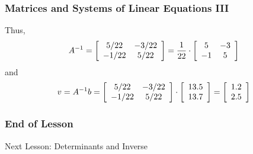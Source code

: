 \documentclass[xcolor=dvipsnames]{beamer}
\begin{document}
\begin{frame}
  \frametitle{Matrices and Systems of Linear Equations III}
Thus,
\begin{equation}
  \label{eq:oogeujie}
  A^{-1}=\left[\begin{array}{cc}
 5/22  & -3/22 \\
 -1/22 & 5/22
               \end{array}\right]=\frac{1}{22}\cdot\left[
               \begin{array}{cc}
                 5 & -3 \\
                 -1 & 5
               \end{array}\right]\notag
\end{equation}
and
\begin{equation}
  \label{eq:seeleeje}
  v=A^{-1}b=\left[\begin{array}{cc}
 5/22  & -3/22 \\
 -1/22 & 5/22
  \end{array}\right]\cdot
\left[\begin{array}{c}
 13.5   \\
 13.7  
  \end{array}\right]=\left[\begin{array}{c}
 1.2   \\
 2.5  
  \end{array}\right]\notag
\end{equation}
\end{frame}

\begin{frame}
  \frametitle{End of Lesson}
Next Lesson: Determinants and Inverse
\end{frame}
\end{document}
